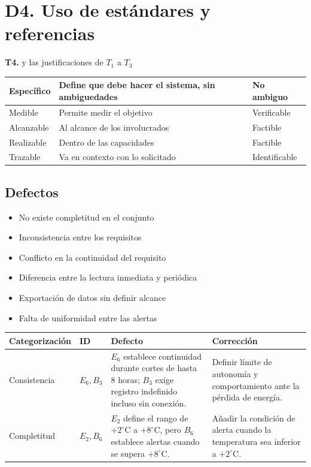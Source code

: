 \documentclass{article}
\begin{document}
\section*{D4. Uso de estándares y referencias}
\textbf{T4.} y las justificaciones de $T_1$ a $T_3$
\begin{center}
\begin{tabular}{|p{2cm}|p{5cm}|p{3cm}|}
\hline
Específico & Define que debe hacer el sistema, sin ambiguedades & No ambiguo \\ \hline
Medible & Permite medir el objetivo & Verificable \\ \hline
Alcanzable & Al alcance de los involucrados & Factible \\ \hline
Realizable & Dentro de las capacidades & Factible \\ \hline
Trazable & Va en contexto con lo solicitado & Identificable \\ \hline
\end{tabular}
\end{center}

\subsection*{Defectos}
\begin{itemize}
    \item No existe completitud en el conjunto
    \item Inconsistencia entre los requisitos
    \item Conflicto en la continuidad del requisito
    \item Diferencia entre la lectura inmediata y periódica
    \item Exportación de datos sin definir alcance
    \item Falta de uniformidad entre las alertas
\end{itemize}

\begin{center}
\begin{tabular}{|p{3cm}|p{1cm}|p{4.5cm}|p{4.5cm}|}
\hline
\textbf{Categorización} & \textbf{ID} & \textbf{Defecto} & \textbf{Corrección} \\ \hline
Consistencia & $E_6, B_3$ & $E_6$ establece continuidad durante cortes de hasta 8 horas; $B_3$ exige registro indefinido incluso sin conexión. & Definir límite de autonomía y comportamiento ante la pérdida de energía. \\ \hline
Completitud & $E_2, B_6$ & $E_2$ define el rango de $+2^{\circ}\text{C}$ a $+8^{\circ}\text{C}$, pero $B_6$ establece alertas cuando se supera $+8^{\circ}\text{C}$. & Añadir la condición de alerta cuando la temperatura sea inferior a $+2^{\circ}\text{C}$. \\ \hline
\end{tabular}
\end{center}
\end{document}
